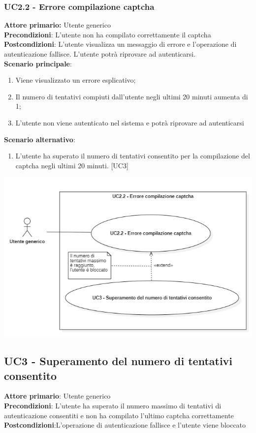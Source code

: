 \subsubsection{UC2.2 - Errore compilazione captcha}
\textbf{Attore primario:} Utente generico\\
\textbf{Precondizioni}: L’utente non ha compilato correttamente il captcha\\
\textbf{Postcondizioni}:  L’utente visualizza un messaggio di errore e l’operazione di autenticazione fallisce. L’utente potrà riprovare  ad autenticarsi.\\

\textbf{Scenario principale}:
\begin{enumerate}
	\item Viene visualizzato un errore esplicativo;
	\item Il numero di tentativi compiuti dall’utente negli ultimi 20 minuti aumenta di 1;
	\item L’utente non viene autenticato nel sistema e potrà  riprovare ad autenticarsi
\end{enumerate}

\textbf{Scenario alternativo}:
\begin{enumerate}
	\item L’utente ha superato il numero di tentativi consentito per la compilazione del captcha negli ultimi 20 minuti. [UC3]
\end{enumerate}

\begin{center}
	\includegraphics[scale = 0.9]{img/Errore_captcha.png}\\
\end{center}

\subsection{UC3 - Superamento del numero di tentativi consentito}
\textbf{Attore primario}: Utente generico\\
\textbf{Precondizioni}: L'utente ha superato il numero massimo di tentativi di autenticazione consentiti e non ha compilato l'ultimo captcha correttamente\\
\textbf{Postcondizioni}:L'operazione di autenticazione fallisce e l'utente viene bloccato\\

